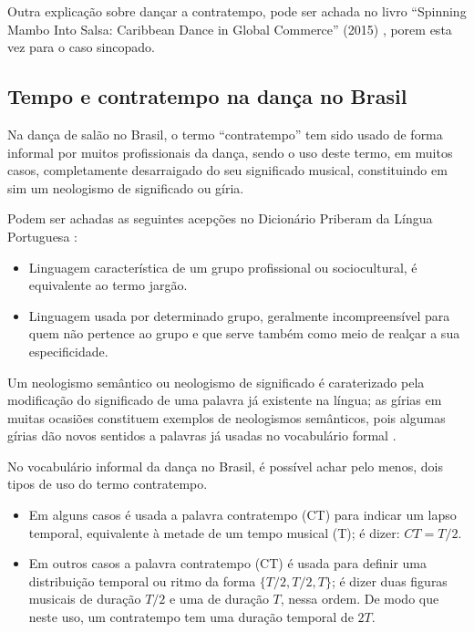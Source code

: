 Outra explicação sobre dançar a contratempo, pode ser achada
no livro ``Spinning Mambo Into Salsa: Caribbean Dance in Global Commerce'' (2015) \cite[pp. 68]{mcmains2015spinning},
porem esta vez para o caso sincopado. 


\subsection{Tempo e contratempo na dança no Brasil}
\label{subsec:contratempobrasil}
Na dança de salão no Brasil, 
o termo ``contratempo'' tem sido usado de forma informal por muitos profissionais da dança,
sendo o uso deste termo, em muitos casos, completamente desarraigado do seu significado musical,
constituindo em sim um neologismo de significado ou gíria.

\begin{definition}[Gíria:] 
\label{def:Giria}
Podem ser achadas as seguintes acepções no Dicionário Priberam da Língua Portuguesa \cite{priberamgiria}:
\begin{itemize}
\item Linguagem característica de um grupo profissional ou sociocultural, é equivalente ao termo jargão.
\item Linguagem usada por determinado grupo, 
geralmente incompreensível para quem não pertence ao grupo e que serve também como meio de realçar a sua especificidade.
\end{itemize}
\end{definition}

\begin{definition} 
\label{def:NeologismoSemantico}
Um neologismo semântico ou neologismo de significado é caraterizado pela modificação do significado de uma palavra já existente na língua;
as gírias em muitas ocasiões constituem exemplos de neologismos semânticos, 
pois algumas gírias dão novos sentidos a palavras já usadas no vocabulário formal \cite[pp. 82-83]{correalingua}.
\end{definition}

No vocabulário informal da dança no Brasil,
é possível achar pelo menos, dois tipos de uso do termo contratempo.
\begin{itemize}
\item Em alguns casos é usada a palavra contratempo (CT) para indicar um lapso temporal, 
equivalente à metade de um tempo musical (T); é dizer: $CT=T/2$.
\item Em outros casos a palavra contratempo (CT) é usada para definir uma distribuição temporal 
ou ritmo da forma $\{T/2, T/2, T\}$; é dizer duas figuras musicais de duração $T/2$ e uma de duração $T$,
nessa ordem. De modo que neste uso, um contratempo tem uma duração temporal de $2T$. 
\end{itemize}

